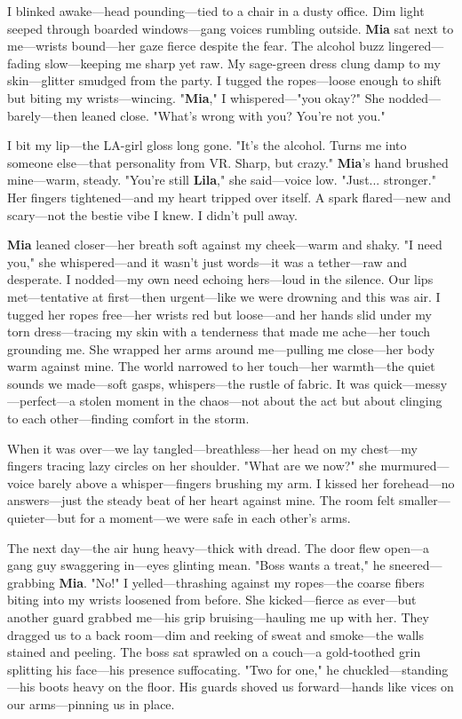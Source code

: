 \documentclass{article}
\begin{document}
I blinked awake—head pounding—tied to a chair in a dusty office. Dim light seeped through boarded windows—gang voices rumbling outside. \textbf{Mia} sat next to me—wrists bound—her gaze fierce despite the fear. The alcohol buzz lingered—fading slow—keeping me sharp yet raw. My sage-green dress clung damp to my skin—glitter smudged from the party. I tugged the ropes—loose enough to shift but biting my wrists—wincing. "\textbf{Mia}," I whispered—"you okay?" She nodded—barely—then leaned close. "What’s wrong with you? You’re not you."

I bit my lip—the LA-girl gloss long gone. "It’s the alcohol. Turns me into someone else—that personality from VR. Sharp, but crazy." \textbf{Mia}’s hand brushed mine—warm, steady. "You’re still \textbf{Lila}," she said—voice low. "Just... stronger." Her fingers tightened—and my heart tripped over itself. A spark flared—new and scary—not the bestie vibe I knew. I didn’t pull away.

\textbf{Mia} leaned closer—her breath soft against my cheek—warm and shaky. "I need you," she whispered—and it wasn’t just words—it was a tether—raw and desperate. I nodded—my own need echoing hers—loud in the silence. Our lips met—tentative at first—then urgent—like we were drowning and this was air. I tugged her ropes free—her wrists red but loose—and her hands slid under my torn dress—tracing my skin with a tenderness that made me ache—her touch grounding me. She wrapped her arms around me—pulling me close—her body warm against mine. The world narrowed to her touch—her warmth—the quiet sounds we made—soft gasps, whispers—the rustle of fabric. It was quick—messy—perfect—a stolen moment in the chaos—not about the act but about clinging to each other—finding comfort in the storm.

When it was over—we lay tangled—breathless—her head on my chest—my fingers tracing lazy circles on her shoulder. "What are we now?" she murmured—voice barely above a whisper—fingers brushing my arm. I kissed her forehead—no answers—just the steady beat of her heart against mine. The room felt smaller—quieter—but for a moment—we were safe in each other’s arms.

The next day—the air hung heavy—thick with dread. The door flew open—a gang guy swaggering in—eyes glinting mean. "Boss wants a treat," he sneered—grabbing \textbf{Mia}. "No!" I yelled—thrashing against my ropes—the coarse fibers biting into my wrists loosened from before. She kicked—fierce as ever—but another guard grabbed me—his grip bruising—hauling me up with her. They dragged us to a back room—dim and reeking of sweat and smoke—the walls stained and peeling. The boss sat sprawled on a couch—a gold-toothed grin splitting his face—his presence suffocating. "Two for one," he chuckled—standing—his boots heavy on the floor. His guards shoved us forward—hands like vices on our arms—pinning us in place.
\end{document}
